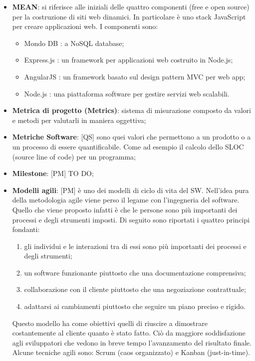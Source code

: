 \begin{itemize}
	\item \textbf{MEAN}: si riferisce alle iniziali delle quattro componenti (free e open source) per la costruzione di siti web dinamici. \newline
In particolare è uno stack JavaScript per creare applicazioni web. \newline
I componenti sono:
	\begin{itemize}
		\item Mondo DB : a NoSQL database;
		\item Express.js : un framework per applicazioni web costruito in Node.js;
		\item AngularJS : un framework basato sul design pattern MVC per web app;
		\item Node.js : una piattaforma software per gestire servizi web scalabili.
	\end{itemize}

	\item \textbf{Metrica di progetto (Metrics)}: sistema di misurazione composto da valori e metodi per valutarli in maniera oggettiva; 

	\item \textbf{Metriche Software}: [QS] sono quei valori che permettono a un prodotto o a un processo di essere quantificabile. Come ad esempio il calcolo dello SLOC (source line of code) per un programma;



	\item \textbf{Milestone}: [PM] TO DO;


	\item \textbf{Modelli agili}: [PM] è uno dei modelli di ciclo di vita del SW. \newline
Nell'idea pura della metodologia agile viene perso il legame con l'ingegneria del software.
Quello che viene proposto infatti è che le persone sono più importanti dei processi e degli strumenti imposti. Di seguito sono riportati i quattro principi fondanti:
		\begin{enumerate}
			\item gli individui e le interazioni tra di essi sono più importanti dei processi e degli strumenti;
			\item un software funzionante piuttosto che una documentazione comprensiva;
			\item collaborazione con il cliente piuttosto che una negoziazione contrattuale;
			\item adattarsi ai cambiamenti piuttosto che seguire un piano preciso e rigido.
		\end{enumerate}
Questo modello ha come obiettivi quelli di riuscire a dimostrare costantemente al cliente quanto è stato fatto. Ciò da maggiore soddisfazione agli sviluppatori che vedono in breve tempo l'avanzamento del risultato finale. \newline
Alcune tecniche agili sono: Scrum (caos organizzato) e Kanban (just-in-time).


\end{itemize}

